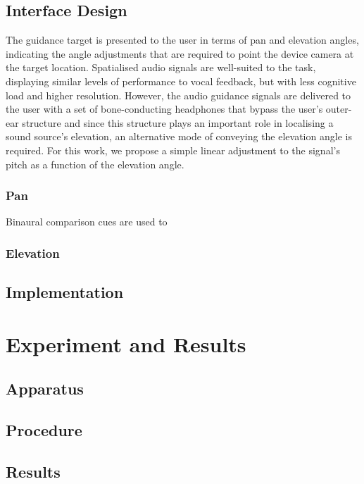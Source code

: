 \documentclass{llncs}
\begin{document}
\subsection{Interface Design}

The guidance target is presented to the user in terms of pan and elevation angles, indicating the angle adjustments that are required to point the device camera at the target location.
Spatialised audio signals are well-suited to the task, displaying similar levels of performance to vocal feedback, but with less cognitive load and higher resolution.
However, the audio guidance signals are delivered to the user with a set of bone-conducting headphones that bypass the user's outer-ear structure and since this structure plays an important role in localising a sound source's elevation, an alternative mode of conveying the elevation angle is required.
For this work, we propose a simple linear adjustment to the signal's pitch as a function of the elevation angle. 

\subsubsection{Pan}

Binaural comparison cues are used to 

\subsubsection{Elevation}

\subsection{Implementation}

\section{Experiment and Results}

\subsection{Apparatus}

\subsection{Procedure}

\subsection{Results}
\end{document}
